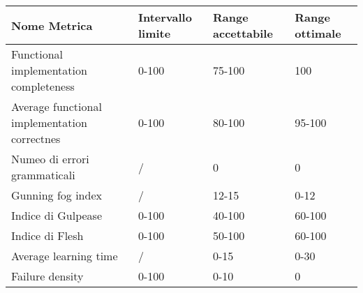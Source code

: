 \begin{table}[H]
	\centering
	\begin{tabular}{|p{4cm}|C{3cm}|C{3cm}|C{3cm}|}
		\hline
		Nome Metrica & Intervallo limite & Range accettabile & Range ottimale \\ \hline
		Functional implementation completeness & 0-100 & 75-100 & 100 \\ \hline
		Average functional implementation correctnes&0-100&80-100&95-100 \\ \hline
		Numeo di errori grammaticali & / & 0 & 0 \\ \hline
		Gunning fog index & / &12-15&0-12 \\ \hline
		Indice di Gulpease & 0-100& 40-100& 60-100 \\ \hline
		Indice di Flesh& 0-100 & 50-100& 60-100\\ \hline
		Average learning time& / &0-15 & 0-30 \\ \hline
		Failure density&0-100&0-10&0\\ \hline
	\end{tabular}
\end{table}
\pagebreak
